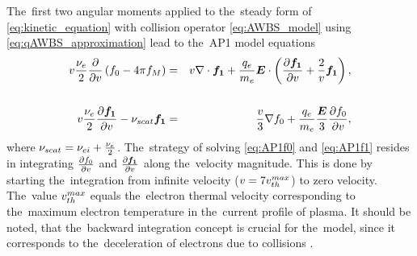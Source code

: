 The~first two angular moments applied to the~steady form of 
\eqref{eq:kinetic_equation} with collision operator \eqref{eq:AWBS_model} 
using \eqref{eq:qAWBS_approximation} lead to the~AP1 model equations
\begin{eqnarray}
  v\frac{\nu_{e}}{2}\frac{\partial{}}{\partial{v}}\left(f_0 - 4\pi f_M \right) &=&
  v\nabla\cdot\boldsymbol{f_1} + \frac{q_e}{m_e}\boldsymbol{E}\cdot\left(
  \frac{\partial{\boldsymbol{f_1}}}{\partial{v}} + \frac{2}{v}\boldsymbol{f_1}\right) , 
  \nonumber \\
  \label{eq:AP1f0}\\
  v\frac{\nu_{e}}{2}\frac{\partial{\boldsymbol{f_1}}}{\partial{v}}
  - \nu_{scat}\boldsymbol{f_1} &=& 
  \frac{v}{3}\nabla f_0 + 
  \frac{q_e}{m_e}\frac{\boldsymbol{E}}{3}\frac{\partial{f_0}}{\partial{v}} ,
  \label{eq:AP1f1}
\end{eqnarray}
where $\nu_{scat} = \nu_{ei} + \frac{\nu_{e}}{2}$. The~strategy of solving 
\eqref{eq:AP1f0} and \eqref{eq:AP1f1} resides in integrating 
$\frac{\partial{f_0}}{\partial{v}}$
and $\frac{\partial{\boldsymbol{f_1}}}{\partial{v}}$ along the~velocity magnitude. 
This is done by starting the~integration
from infinite velocity ($v = 7 v_{th}^{max}$) to zero velocity. The~value
$v_{th}^{max}$ equals the~electron thermal velocity corresponding to the~maximum 
electron temperature in the~current profile of plasma.
It should be noted, that the~backward integration concept is crucial for 
the~model, since it corresponds to the~deceleration of electrons due to 
collisions \cite{Touati_2014}. 

